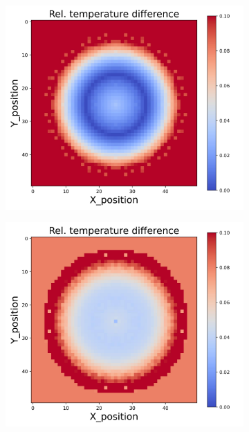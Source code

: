 \begin{figure}[h]
\begin{minipage}{\textwidth}
\begin{subfigure}{0.3\textwidth}
        \end{subfigure}
        \begin{subfigure}{0.3\textwidth}
            \centering
            \includegraphics[width=\textwidth]{figures/raw_data/23/mix/T_bias.jpg}
        \end{subfigure}
        \begin{subfigure}{0.3\textwidth}
            \centering
            \includegraphics[width=\textwidth]{figures/raw_data/24/mix/T_bias.jpg}

\end{subfigure}
\end{minipage}
\end{figure}
